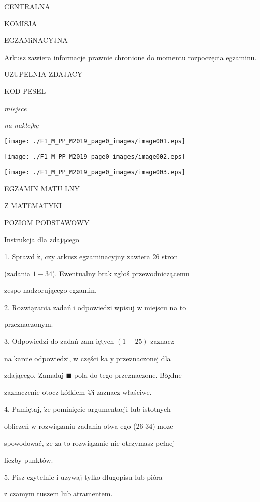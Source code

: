 \documentclass[a4paper,12pt]{article}
\begin{document}
CENTRALNA

KOMISJA

EGZAMiNACYJNA

Arkusz zawiera informacje prawnie chronione do momentu rozpoczęcia egzaminu.

UZUPELNIA ZDAJACY

KOD PESEL

{\it miejsce}

{\it na naklejkę}
\begin{center}
\texttt{[image: ./F1\_M\_PP\_M2019\_page0\_images/image001.eps]}

\texttt{[image: ./F1\_M\_PP\_M2019\_page0\_images/image002.eps]}

\texttt{[image: ./F1\_M\_PP\_M2019\_page0\_images/image003.eps]}
\end{center}
EGZAMIN MATU LNY

Z MATEMATYKI

POZIOM PODSTAWOWY

Instrukcja dla zdającego

1. Sprawd $\acute{\mathrm{z}}$, czy arkusz egzaminacyjny zawiera 26 stron

(zadania $1-34$). Ewentualny brak zgłoś przewodniczącemu

zespo nadzorującego egzamin.

2. Rozwiązania zadań i odpowiedzi wpisuj w miejscu na to

przeznaczonym.

3. Odpowiedzi do zadań zam iętych $(1-25)$ zaznacz

na karcie odpowiedzi, w części ka $\mathrm{y}$ przeznaczonej dla

zdającego. Zamaluj $\blacksquare$ pola do tego przeznaczone. Błędne

zaznaczenie otocz kółkiem \copyright i zaznacz właściwe.

4. Pamiętaj, $\dot{\mathrm{z}}\mathrm{e}$ pominięcie argumentacji lub istotnych

obliczeń w rozwiązaniu zadania otwa ego (26-34) $\mathrm{m}\mathrm{o}\dot{\mathrm{z}}\mathrm{e}$

spowodować, $\dot{\mathrm{z}}\mathrm{e}$ za to rozwiązanie nie otrzymasz pełnej

liczby punktów.

5. Pisz czytelnie i uzywaj tylko długopisu lub pióra

z czamym tuszem lub atramentem.
\end{document}

